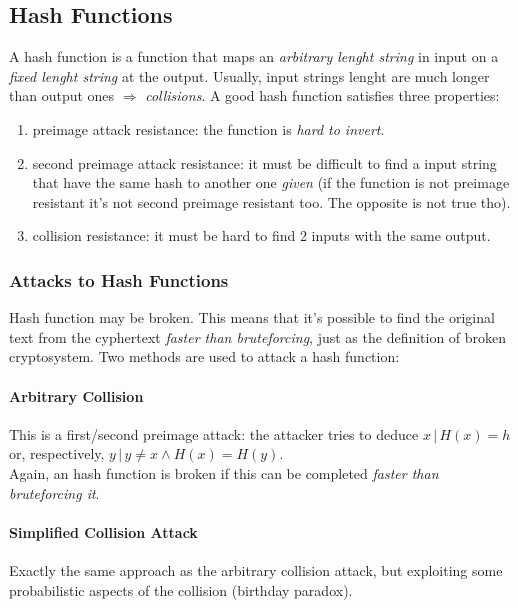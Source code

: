 \documentclass{article}
\begin{document}
			\subsection{Hash Functions}
				A hash function is a function that maps an \emph{arbitrary lenght string} in input on a \emph{fixed lenght string} at the output. Usually, input strings lenght are much longer than output ones $\Rightarrow$ \emph{collisions}. A good hash function satisfies three properties:
				\begin{enumerate}
					\item preimage attack resistance: the function is \emph{hard to invert}.
					\item second preimage attack resistance: it must be difficult to find a input string that have the same hash to another one \emph{given} (if the function is not preimage resistant it's not second preimage resistant too. The opposite is not true tho).
					\item collision resistance: it must be hard to find 2 inputs with the same output.
				\end{enumerate}
				
				\subsubsection{Attacks to Hash Functions}
					Hash function may be broken. This means that it's possible to find the original text from the cyphertext \emph{faster than bruteforcing}, just as the definition of broken cryptosystem. Two methods are used to attack a hash function:
					
					\paragraph{Arbitrary Collision}
						This is a first/second preimage attack: the attacker tries to deduce $x \,\vert\, H(x) = h$ or, respectively, $y \,\vert\, y \neq x \wedge H(x) = H(y)$.\\
						Again, an hash function is broken if this can be completed \emph{faster than bruteforcing it}.
						
					\paragraph{Simplified Collision Attack}
						Exactly the same approach as the arbitrary collision attack, but exploiting some probabilistic aspects of the collision (birthday paradox).
				
\end{document}

